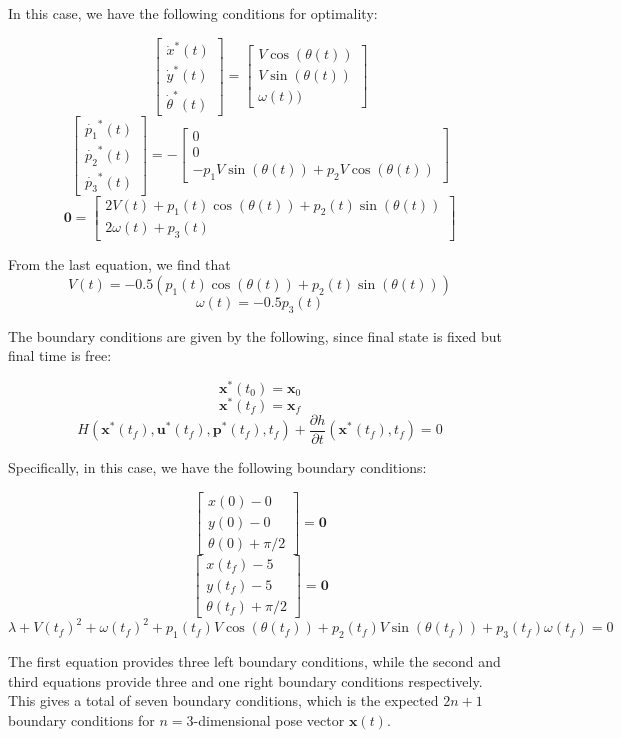\documentclass{article}
\begin{document}
\begin{enumerate}[label=(\roman*)]
    In this case, we have the following conditions for optimality:
    \begin{framed}
    $$\begin{bmatrix} \dot{x}^*(t) \\ \dot{y}^*(t) \\ \dot{\theta}^*(t) \end{bmatrix} = \begin{bmatrix} V\cos(\theta(t)) \\ V\sin(\theta(t)) \\ \omega(t)) \end{bmatrix}$$
    $$\begin{bmatrix} \dot{p_1}^*(t) \\ \dot{p_2}^*(t) \\ \dot{p_3}^*(t) \end{bmatrix} = - \begin{bmatrix} 0 \\ 0 \\ -p_1V\sin(\theta(t)) + p_2V\cos(\theta(t)) \end{bmatrix}$$
    $$\mathbf{0} = \begin{bmatrix} 2V(t) + p_1(t)\cos(\theta(t)) + p_2(t)\sin(\theta(t)) \\ 2\omega(t) + p_3(t)\end{bmatrix}$$
    \end{framed}
    From the last equation, we find that 
    $$V(t) = -0.5(p_1(t)\cos(\theta(t)) + p_2(t)\sin(\theta(t)))$$ 
    $$\omega(t) = -0.5p_3(t)$$
    
    \newpage
    The boundary conditions are given by the following, since final state is fixed but final time is free:
    
    $$\mathbf{x}^*(t_0) = \mathbf{x}_0$$
    $$\mathbf{x}^*(t_f) = \mathbf{x}_f$$
    $$H(\mathbf{x}^*(t_f), \mathbf{u}^*(t_f), \mathbf{p}^*(t_f), t_f) + \frac{\partial{h}}{\partial{t}}(\mathbf{x}^*(t_f), t_f) = 0$$
    
    Specifically, in this case, we have the following boundary conditions:
    \begin{framed}
    $$\begin{bmatrix}x(0) - 0 \\ y(0) - 0 \\ \theta(0) + \pi/2 \end{bmatrix} = \mathbf{0}$$
    $$\begin{bmatrix}x(t_f) - 5 \\ y(t_f) - 5 \\ \theta(t_f) + \pi/2\end{bmatrix} = \mathbf{0}$$
    $$\lambda + V(t_f)^2 + \omega(t_f)^2 + p_1(t_f)V\cos(\theta(t_f)) + p_2(t_f)V\sin(\theta(t_f)) + p_3(t_f)\omega(t_f) = 0$$
    \end{framed}
    The first equation provides three left boundary conditions, while the second and third equations provide three and one right boundary conditions respectively. This gives a total of seven boundary conditions, which is the expected $2n+1$ boundary conditions for $n=3$-dimensional pose vector  $\mathbf{x}(t)$.
    

\end{enumerate}
\end{document}
